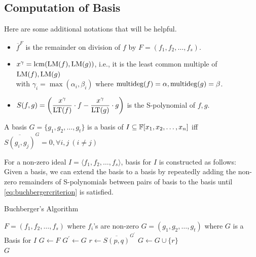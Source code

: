 \documentclass[a4paper,11pt]{article}
\begin{document}
\subsection{Computation of \Grob Basis}
\begin{defn}Here are some additional notations that will be helpful.
    \begin{itemize}
        \item $\overline{f}^F$ is the remainder on division of $f$ by $F=(f_1,f_2,\ldots,f_s)$.
        \item $x^\gamma=\operatorname{lcm}(\operatorname{LM}(f),\operatorname{LM}(g))$, i.e., it is the least common multiple of $\operatorname{LM}(f),\operatorname{LM}(g)$\\ with $\gamma_i=\max(\alpha_i,\beta_i)$ where $\operatorname{multideg}(f)=\alpha, \operatorname{multideg}(g)=\beta$.
        \item $S(f,g)=\left(\dfrac{x^\gamma}{\operatorname{LT}(f)}\cdot f-\dfrac{x^\gamma}{\operatorname{LT}(g)}\cdot g\right)$ is the S-polynomial of $f,g$.
    \end{itemize}
\end{defn}
\begin{theorem}{\label{eq:buchbergercriterion}}
    A basis $G = \{g_1, g_2, \ldots, g_t\}$ is a \Grob basis of $I\subseteq\mathbb{F}[x_1, x_2, \ldots, x_n]$ iff $\overline{S(g_i,g_j)}^G=0, \forall i,j\ (i\neq j)$
\end{theorem}
\begin{theorem}{\label{algo:buchberger}}
    For a non-zero ideal $I=\langle f_1,f_2,\ldots,f_s\rangle$, \Grob basis for $I$ is constructed as follows:\\
    Given a basis, we can extend the basis to a \Grob basis by repeatedly adding the non-zero remainders of S-polynomials between pairs of basis to the basis until \ref{eq:buchbergercriterion} is satisfied.
\end{theorem}
\begin{center}
    \begin{algorithm}
    \caption{Buchberger's Algorithm}\label{alg:polynomialdivisionsingle}
    \begin{algorithmic}
    \Require $F=(f_1,f_2,\ldots,f_s)$ where $f_i$'s are non-zero
    \Ensure $G=(g_1, g_2, \ldots, g_t)$ where $G$ is a \Grob Basis for $I$
    \State $G \gets F$
    \Repeat
    \State $G^\prime \gets G$
    \State $r\gets \overline{S(p,q)}^{G^\prime}$
    \State $G\gets G\cup\{r\}$
    \EndIf
    \EndFor
    \\
    \Return $G$
    \end{algorithmic}
    \end{algorithm}
\end{center}
\end{document}
